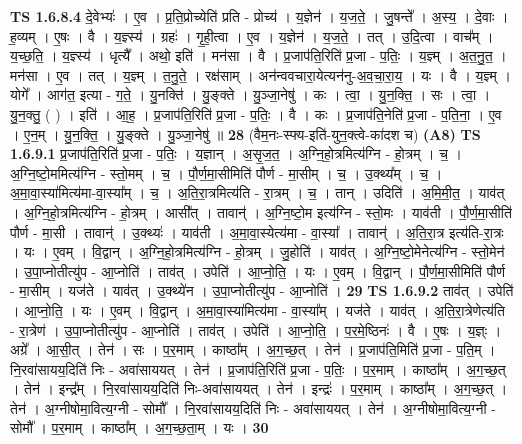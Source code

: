 \documentclass[17pt]{extarticle}
\begin{document}
                  \newline
                                \textbf{ TS 1.6.8.4} \newline
                  दे॒वेभ्यः॑ । ए॒व । प्र॒ति॒प्रोच्येति॑ प्रति - प्रोच्य॑ । य॒ज्ञेन॑ । य॒ज॒ते॒ । जु॒षन्ते᳚ । अ॒स्य॒ । दे॒वाः । ह॒व्यम् । ए॒षः । वै । य॒ज्ञ्स्य॑ । ग्रहः॑ । गृ॒ही॒त्वा । ए॒व । य॒ज्ञेन॑ । य॒ज॒ते॒ । तत् । उ॒दि॒त्वा । वाच᳚म् । य॒च्छ॒ति॒ । य॒ज्ञ्स्य॑ । धृत्यै᳚ । अथो॒ इति॑ । मन॑सा । वै । प्र॒जाप॑ति॒रिति॑ प्र॒जा - प॒तिः॒ । य॒ज्ञ्म् । अ॒त॒नु॒त॒ । मन॑सा । ए॒व । तत् । य॒ज्ञ्म् । त॒नु॒ते॒ । रक्ष॑साम् । अन॑न्ववचारा॒येत्यन॑नु-अ॒व॒चा॒रा॒य॒ । यः । वै । य॒ज्ञ्म् । योगे᳚ । आग॑त॒ इत्या - ग॒ते॒ । यु॒नक्ति॑ । यु॒ङ्क्ते । यु॒ञ्जा॒नेषु॑ । कः । त्वा॒ । यु॒न॒क्ति॒ । सः । त्वा॒ । यु॒न॒क्तु॒ ( ) । इति॑ । आ॒ह॒ । प्र॒जाप॑ति॒रिति॑ प्र॒जा - प॒तिः॒ । वै । कः । प्र॒जाप॑ति॒नेति॑ प्र॒जा - प॒ति॒ना॒ । ए॒व । ए॒न॒म् । यु॒न॒क्ति॒ । यु॒ङ्क्ते । यु॒ञ्जा॒नेषु॑ ॥ \textbf{  28} \newline
                  \newline
                      (वैम॒नः-स्फ्य-इति॑-युन॒क्त्वे-का॑दश च)  \textbf{(A8)} \newline \newline
                                \textbf{ TS 1.6.9.1} \newline
                  प्र॒जाप॑ति॒रिति॑ प्र॒जा - प॒तिः॒ । य॒ज्ञान् । अ॒सृ॒ज॒त॒ । अ॒ग्नि॒हो॒त्रमित्य॑ग्नि - हो॒त्रम् । च॒ । अ॒ग्नि॒ष्टो॒ममित्य॑ग्नि - स्तो॒मम् । च॒ । पौ॒र्ण॒मा॒सीमिति॑ पौर्ण - मा॒सीम् । च॒ । उ॒क्थ्य᳚म् । च॒ । अ॒मा॒वा॒स्या॑मित्य॑मा-वा॒स्या᳚म् । च॒ । अ॒ति॒रा॒त्रमित्य॑ति - रा॒त्रम् । च॒ । तान् । उदिति॑ । अ॒मि॒मी॒त॒ । याव॑त् । अ॒ग्नि॒हो॒त्रमित्य॑ग्नि - हो॒त्रम् । आसी᳚त् । तावान्॑ । अ॒ग्नि॒ष्टो॒म इत्य॑ग्नि - स्तो॒मः । याव॑ती । पौ॒र्ण॒मा॒सीति॑ पौर्ण - मा॒सी । तावान्॑ । उ॒क्थ्यः॑ । याव॑ती । अ॒मा॒वा॒स्येत्य॑मा - वा॒स्या᳚ । तावान्॑ । अ॒ति॒रा॒त्र इत्य॑ति-रा॒त्रः । यः । ए॒वम् । वि॒द्वान् । अ॒ग्नि॒हो॒त्रमित्य॑ग्नि - हो॒त्रम् । जु॒होति॑ । याव॑त् । अ॒ग्नि॒ष्टो॒मेनेत्य॑ग्नि - स्तो॒मेन॑ । उ॒पा॒प्नोतीत्यु॑प - आ॒प्नोति॑ । ताव॑त् । उपेति॑ । आ॒प्नो॒ति॒ । यः । ए॒वम् । वि॒द्वान् । पौ॒र्ण॒मा॒सीमिति॑ पौर्ण - मा॒सीम् । यज॑ते । याव॑त् । उ॒क्थ्ये॑न । उ॒पा॒प्नोतीत्यु॑प - आ॒प्नोति॑ । \textbf{  29} \newline
                  \newline
                                \textbf{ TS 1.6.9.2} \newline
                  ताव॑त् । उपेति॑ । आ॒प्नो॒ति॒ । यः । ए॒वम् । वि॒द्वान् । अ॒मा॒वा॒स्या॑मित्य॑मा - वा॒स्या᳚म् । यज॑ते । याव॑त् । अ॒ति॒रा॒त्रेणेत्य॑ति - रा॒त्रेण॑ । उ॒पा॒प्नोतीत्यु॑प - आ॒प्नोति॑ । ताव॑त् । उपेति॑ । आ॒प्नो॒ति॒ । प॒र॒मे॒ष्ठिनः॑ । वै । ए॒षः । य॒ज्ञ्ः । अग्रे᳚ । आ॒सी॒त् । तेन॑ । सः । प॒र॒माम् । काष्ठा᳚म् । अ॒ग॒च्छ॒त् । तेन॑ । प्र॒जाप॑ति॒मिति॑ प्र॒जा - प॒ति॒म् । नि॒रवा॑सायय॒दिति॑ निः - अवा॑साययत् । तेन॑ । प्र॒जाप॑ति॒रिति॑ प्र॒जा - प॒तिः॒ । प॒र॒माम् । काष्ठा᳚म् । अ॒ग॒च्छ॒त् । तेन॑ । इन्द्र᳚म् । नि॒रवा॑सायय॒दिति॑ निः-अवा॑साययत् । तेन॑ । इन्द्रः॑ । प॒र॒माम् । काष्ठा᳚म् । अ॒ग॒च्छ॒त् । तेन॑ । अ॒ग्नीषोमा॒वित्य॒ग्नी - सोमौ᳚ । नि॒रवा॑सायय॒दिति॑ निः - अवा॑साययत् । तेन॑ । अ॒ग्नीषोमा॒वित्य॒ग्नी - सोमौ᳚ । प॒र॒माम् । काष्ठा᳚म् । अ॒ग॒च्छ॒ता॒म् । यः । \textbf{  30} \newline
\end{document}
